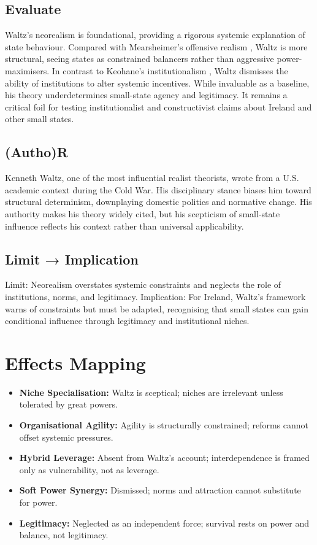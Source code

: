 \documentclass[12pt,a4paper]{article}
\begin{document}
\subsection*{Evaluate}
Waltz’s neorealism is foundational, providing a rigorous systemic explanation of state behaviour. Compared with Mearsheimer’s offensive realism \parencite{MEARSHEIMER_1994}, Waltz is more structural, seeing states as constrained balancers rather than aggressive power-maximisers. In contrast to Keohane’s institutionalism \parencite{KEOHANE_1988}, Waltz dismisses the ability of institutions to alter systemic incentives. While invaluable as a baseline, his theory underdetermines small-state agency and legitimacy. It remains a critical foil for testing institutionalist and constructivist claims about Ireland and other small states.

\subsection*{(Autho)R}
Kenneth Waltz, one of the most influential realist theorists, wrote from a U.S. academic context during the Cold War. His disciplinary stance biases him toward structural determinism, downplaying domestic politics and normative change. His authority makes his theory widely cited, but his scepticism of small-state influence reflects his context rather than universal applicability.

\subsection*{Limit → Implication}
Limit: Neorealism overstates systemic constraints and neglects the role of institutions, norms, and legitimacy.  
Implication: For Ireland, Waltz’s framework warns of constraints but must be adapted, recognising that small states can gain conditional influence through legitimacy and institutional niches.

\section*{Effects Mapping}
\begin{itemize}
	\item \textbf{Niche Specialisation:} Waltz is sceptical; niches are irrelevant unless tolerated by great powers.
	\item \textbf{Organisational Agility:} Agility is structurally constrained; reforms cannot offset systemic pressures.
	\item \textbf{Hybrid Leverage:} Absent from Waltz’s account; interdependence is framed only as vulnerability, not as leverage.
	\item \textbf{Soft Power Synergy:} Dismissed; norms and attraction cannot substitute for power.
	\item \textbf{Legitimacy:} Neglected as an independent force; survival rests on power and balance, not legitimacy.
\end{itemize}
\end{document}
